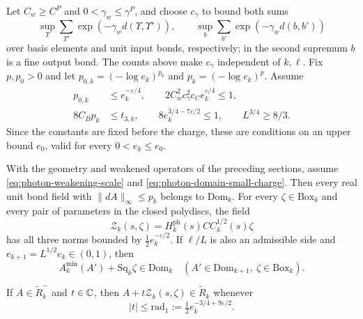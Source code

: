 Let $C_w\ge C^P$ and $0<\gamma_w\le\gamma^P$, and choose
$c_\gamma$ to bound both sums
\[
 \sup_\Upsilon\sum_{\Upsilon'}\exp(-\gamma_wd(\Upsilon,\Upsilon')),
 \qquad
 \sup_b\sum_{b'}\exp(-\gamma_wd(b,b'))
\]
over basis elements and unit input bonds, respectively; in the
second supremum $b$ is a fine output bond.
The counts above make $c_\gamma$ independent of $k,\ell$.
Fix $p,p_0>0$ and let $p_{0,k}=(-\log e_k)^{p_0}$ and $p_k=(-\log e_k)^p$.
Assume
\begin{equation}\label{eq:photon-domain-small-charge}
 \begin{split}
 p_{0,k}&\le e_k^{-\varepsilon/4},\qquad
 2C_w^2c_\gamma^2c_Ce_k^{\varepsilon/4}\le1,\\
 8C_Bp_k&\le t_{3,k},\qquad
 8e_k^{3/4-7\varepsilon/2}\le1,\qquad
 L^{3/4}\ge8/3.
 \end{split}
\end{equation}
Since the constants are fixed before the charge, these are
conditions on an upper bound $e_0$, valid for every
$0<e_k\le e_0$.

\begin{theorem}\label{prop:photon-domain-preservation}
With the geometry and weakened operators of the preceding sections,
assume \eqref{eq:photon-weakening-scale} and
\eqref{eq:photon-domain-small-charge}. Then every real unit
bond field with $\|dA\|_\infty\le p_k$ belongs to
$\mathrm{Dom}_k$. For every $\zeta\in\mathrm{Box}_k$ and every
pair of parameters in the closed polydiscs, the field
\[
 \mathscr Z_k(s,\zeta)
       =H_k^{\mathrm{ph}}(s)C C_k^{1/2}(s)\zeta
\]
has all three norms bounded by $\frac12e_k^{-\varepsilon/2}$.
If $\ell/L$ is also an admissible side and
$e_{k+1}=L^{1/2}e_k\in(0,1)$, then
\begin{equation}\label{eq:photon-domain-preserved-one-step}
 A_k^{\min}(A')+\mathrm{Sq}_k\zeta\in\mathrm{Dom}_k
 \quad(A'\in\mathrm{Dom}_{k+1},\ \zeta\in\mathrm{Box}_k).
\end{equation}

If $A\in\widetilde R_k^-$ and $t\in\mathbb C$, then
$A+t\mathscr Z_k(s,\zeta)\in\widetilde R_k$ whenever
\begin{equation}\label{eq:photon-fluctuation-analytic-radius}
 |t|\le\mathrm{rad}_1:=\tfrac12e_k^{-3/4+9\varepsilon/2}.
\end{equation}
\end{theorem}

